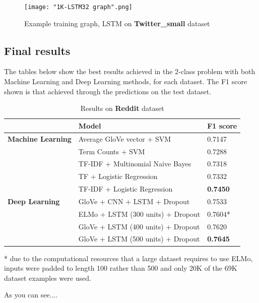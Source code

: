 \documentclass[12pt,a4paper]{article}
\begin{document}
\begin{figure}[H]
	\centering
	\label{training}
	\texttt{[image: "1K-LSTM32 graph".png]}
	\caption{Example training graph, LSTM on \textbf{Twitter\_small} dataset}
\end{figure}


\subsection{Final results}
The tables below show the best results achieved in the 2-class problem with both Machine Learning and Deep Learning methods, for each dataset. The F1 score shown is that achieved through the predictions on the test dataset.

\begin{table}[H]
	\centering
	\vspace*{-18pt}
	\caption{Results on \textbf{Reddit} dataset}
	\label{results1}
	\hspace*{-0.8cm}
	\begin{tabular}{p{3.4cm} p{10cm} p{3cm}} \hline\hline
		& \textbf{Model} & \textbf{F1 score}  \\ \hline
		
		\textbf{Machine Learning} & Average GloVe vector + SVM & 0.7147 \\
		& Term Counts + SVM & 0.7288 \\
		& TF-IDF + Multinomial Naive Bayes & 0.7318 \\ 
		& TF + Logistic Regression & 0.7332 \\
		& TF-IDF + Logistic Regression & \textbf{0.7450} \\ \hline
		
		\textbf{Deep Learning} & GloVe + CNN + LSTM + Dropout & 0.7533 \\
		& ELMo + LSTM (300 units) + Dropout & 0.7604* \\
		& GloVe + LSTM (400 units) + Dropout & 0.7620 \\
		& GloVe + LSTM (500 units) + Dropout & \textbf{0.7645} \\ \hline
	\end{tabular}
\end{table}

* due to the computational resources that a large dataset requires to use ELMo, inputs were padded to length 100 rather than 500 and only 20K of the 69K dataset examples were used. \newline

As you can see....
\end{document}
